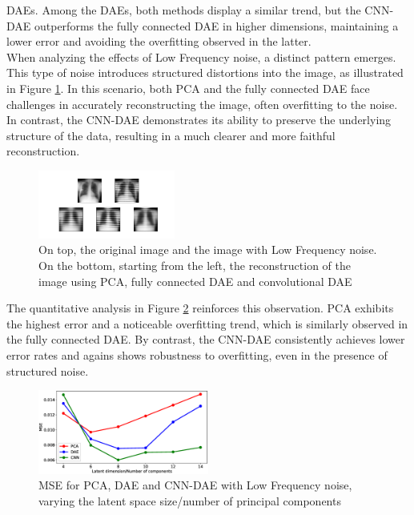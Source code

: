 \documentclass[10pt,conference,compsocconf]{IEEEtran}
\begin{document}
\noindent DAEs. Among the DAEs, both methods display a similar trend, but the CNN-DAE outperforms the fully connected DAE in higher dimensions, maintaining a lower error and avoiding the overfitting observed in the latter.\\

When analyzing the effects of Low Frequency noise, a distinct pattern emerges. This type of noise introduces structured distortions into the image, as illustrated in Figure \ref{fig:low_lungs}. In this scenario, both PCA and the fully connected DAE face challenges in accurately reconstructing the image, often overfitting to the noise. In contrast, the CNN-DAE demonstrates its ability to preserve the underlying structure of the data, resulting in a much clearer and more faithful reconstruction.

\begin{figure}[h!]
  \centering
  \includegraphics[width=0.4\textwidth]{foto/lowfreq_lungs.png}
  \caption{On top, the original image and the image with Low Frequency noise. On the bottom, starting from the left, the reconstruction of the image using PCA, fully connected DAE and convolutional DAE}
  \label{fig:low_lungs}
\end{figure}

The quantitative analysis in Figure \ref{fig:MSE_low_freq} reinforces this observation. PCA exhibits the highest error and a noticeable overfitting trend, which is similarly observed in the fully connected DAE. By contrast, the CNN-DAE consistently achieves lower error
rates and agains shows robustness to overfitting, even in the presence of structured noise. 

\begin{figure}[h!]
  \centering
  \includegraphics[width=0.5\textwidth]{foto/validation_low_freq.eps}
  \caption{MSE for PCA, DAE and CNN-DAE with Low Frequency noise, varying the latent space size/number of principal components}
  \label{fig:MSE_low_freq}
\end{figure}
\end{document}

